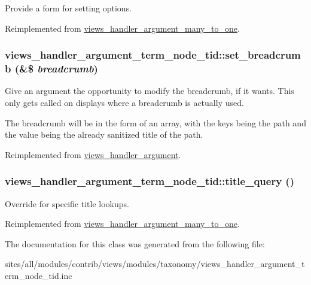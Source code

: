 Provide a form for setting options. 

Reimplemented from \hyperlink{classviews__handler__argument__many__to__one_dd3ed7d59f17d79f48ef8f47e049cb92}{views\_\-handler\_\-argument\_\-many\_\-to\_\-one}.\hypertarget{classviews__handler__argument__term__node__tid_ef9753aafd176e2e63c4a99be1177175}{
\subsubsection[{set\_\-breadcrumb}]{\setlength{\rightskip}{0pt plus 5cm}views\_\-handler\_\-argument\_\-term\_\-node\_\-tid::set\_\-breadcrumb (\&\$ {\em breadcrumb})}}
\label{classviews__handler__argument__term__node__tid_ef9753aafd176e2e63c4a99be1177175}


Give an argument the opportunity to modify the breadcrumb, if it wants. This only gets called on displays where a breadcrumb is actually used.

The breadcrumb will be in the form of an array, with the keys being the path and the value being the already sanitized title of the path. 

Reimplemented from \hyperlink{classviews__handler__argument_06263489052be463efd3c4afdf73851d}{views\_\-handler\_\-argument}.\hypertarget{classviews__handler__argument__term__node__tid_9f858ee5c343f6a14b87a320316710f0}{
\subsubsection[{title\_\-query}]{\setlength{\rightskip}{0pt plus 5cm}views\_\-handler\_\-argument\_\-term\_\-node\_\-tid::title\_\-query ()}}
\label{classviews__handler__argument__term__node__tid_9f858ee5c343f6a14b87a320316710f0}


Override for specific title lookups. 

Reimplemented from \hyperlink{classviews__handler__argument__many__to__one_0b758f84ee6b9a473313ec92714b06c7}{views\_\-handler\_\-argument\_\-many\_\-to\_\-one}.

The documentation for this class was generated from the following file:\begin{CompactItemize}
\item 
sites/all/modules/contrib/views/modules/taxonomy/views\_\-handler\_\-argument\_\-term\_\-node\_\-tid.inc\end{CompactItemize}
